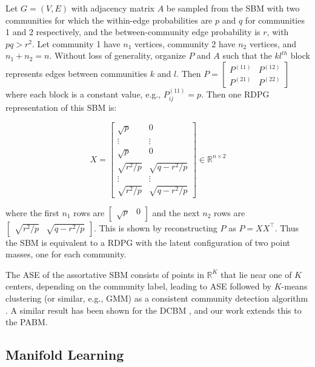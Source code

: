 \documentclass[
  11pt,
]{article}
\begin{document}
\begin{example}
Let $G = (V, E)$ with adjacency matrix $A$ be sampled from the SBM with two communities for which the within-edge probabilities are $p$ and $q$ for communities 1 and 2 respectively, and the between-community edge probability is $r$, with $p q > r^2$. Let community 1 have $n_1$ vertices, community 2 have $n_2$ vertices, and $n_1 + n_2 = n$. Without loss of generality, organize $P$ and $A$ such that the $kl^{th}$ block represents edges between communities $k$ and $l$. Then $P = \begin{bmatrix} P^{(11)} & P^{(12)} \\ P^{(21)} & P^{(22)} \end{bmatrix}$ where each block is a constant value, e.g., $P^{(11)}_{ij} = p$. Then one RDPG representation of this SBM is:

$$X = \begin{bmatrix} 
\sqrt{p} & 0 \\
\vdots & \vdots \\
\sqrt{p} & 0 \\
\sqrt{r^2 / p} & \sqrt{q - r^2 / p} \\ 
\vdots & \vdots \\
\sqrt{r^2 / p} & \sqrt{q - r^2 / p}
\end{bmatrix}
\in \mathbb{R}^{n \times 2}$$

where the first $n_1$ rows are $\begin{bmatrix} \sqrt{p} & 0 \end{bmatrix}$ and the next $n_2$ rows are $\begin{bmatrix} \sqrt{r^2 / p} & \sqrt{q - r^2 / p} \end{bmatrix}$. This is shown by reconstructing $P$ as $P = X X^\top$. Thus the SBM is equivalent to a RDPG with the latent configuration of two point masses, one for each community. 
\end{example}

The ASE of the assortative SBM consists of points in \(\mathbb{R}^K\)
that lie near one of \(K\) centers, depending on the community label,
leading to ASE followed by \(K\)-means clustering (or similar, e.g.,
GMM) as a consistent community detection algorithm \cite{lyzinski2014}.
A similar result has been shown for the DCBM \cite{lyzinski2014}, and
our work extends this to the PABM.

\hypertarget{manifold-learning}{%
\subsection{Manifold Learning}\label{manifold-learning}}
\end{document}
